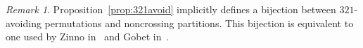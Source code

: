 \documentclass[submission]{FPSAC2024}
\newtheorem{prop}[equation]{Proposition}
\theoremstyle{definition}
\theoremstyle{remark}
\newtheorem{rem}[equation]{Remark}
\numberwithin{equation}{section}
\begin{document}
\begin{rem}
Proposition~\ref{prop:321avoid} implicitly defines a bijection between $321$-avoiding permutations and noncrossing partitions.  This bijection is equivalent to one used by Zinno in~\cite{Z02} and Gobet in~\cite{Gobet}.
\end{rem}

%
%
%
\end{document}
